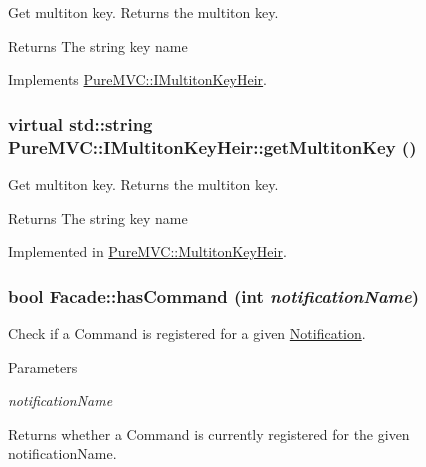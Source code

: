 Get multiton key. Returns the multiton key. \begin{DoxyReturn}{Returns}
The string key name 
\end{DoxyReturn}


Implements \hyperlink{class_pure_m_v_c_1_1_i_multiton_key_heir_aecccfb9898368c6377550ceae5730934}{PureMVC::IMultitonKeyHeir}.\hypertarget{class_pure_m_v_c_1_1_i_multiton_key_heir_aecccfb9898368c6377550ceae5730934}{
\subsubsection[{getMultitonKey}]{\setlength{\rightskip}{0pt plus 5cm}virtual std::string PureMVC::IMultitonKeyHeir::getMultitonKey ()}}
\label{class_pure_m_v_c_1_1_i_multiton_key_heir_aecccfb9898368c6377550ceae5730934}


Get multiton key. Returns the multiton key. \begin{DoxyReturn}{Returns}
The string key name 
\end{DoxyReturn}


Implemented in \hyperlink{class_pure_m_v_c_1_1_multiton_key_heir_aa5622459d33380deb08dc3cab8b991c7}{PureMVC::MultitonKeyHeir}.\hypertarget{class_pure_m_v_c_1_1_facade_aee8eb006e9e5b894226558938ba807ae}{
\subsubsection[{hasCommand}]{\setlength{\rightskip}{0pt plus 5cm}bool Facade::hasCommand (int {\em notificationName})}}
\label{class_pure_m_v_c_1_1_facade_aee8eb006e9e5b894226558938ba807ae}


Check if a Command is registered for a given \hyperlink{class_pure_m_v_c_1_1_notification}{Notification}. 
\begin{DoxyParams}{Parameters}
\item[{\em notificationName}]\end{DoxyParams}
\begin{DoxyReturn}{Returns}
whether a Command is currently registered for the given {\ttfamily notificationName}. 
\end{DoxyReturn}


